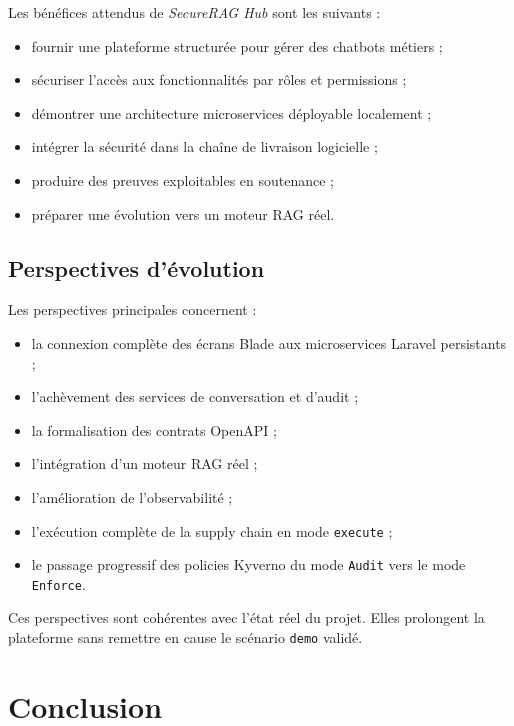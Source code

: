 Les bénéfices attendus de \textit{SecureRAG Hub} sont les suivants :

\begin{itemize}
    \item fournir une plateforme structurée pour gérer des chatbots métiers ;
    \item sécuriser l'accès aux fonctionnalités par rôles et permissions ;
    \item démontrer une architecture microservices déployable localement ;
    \item intégrer la sécurité dans la chaîne de livraison logicielle ;
    \item produire des preuves exploitables en soutenance ;
    \item préparer une évolution vers un moteur RAG réel.
\end{itemize}

\subsection{Perspectives d'évolution}

Les perspectives principales concernent :

\begin{itemize}
    \item la connexion complète des écrans Blade aux microservices Laravel persistants ;
    \item l'achèvement des services de conversation et d'audit ;
    \item la formalisation des contrats OpenAPI ;
    \item l'intégration d'un moteur RAG réel ;
    \item l'amélioration de l'observabilité ;
    \item l'exécution complète de la supply chain en mode \texttt{execute} ;
    \item le passage progressif des policies Kyverno du mode \texttt{Audit} vers le mode \texttt{Enforce}.
\end{itemize}

Ces perspectives sont cohérentes avec l'état réel du projet. Elles prolongent la plateforme sans remettre en cause le scénario \texttt{demo} validé.

\section{Conclusion}

